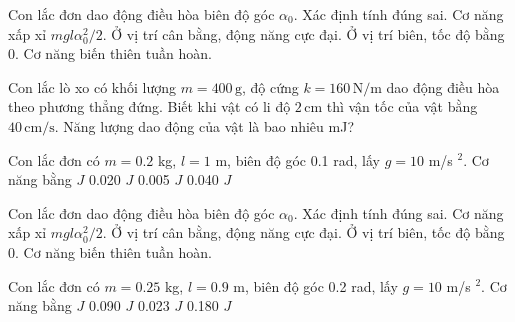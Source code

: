 \begin{ex}
Con lắc đơn dao động điều hòa biên độ góc $\alpha_0$. Xác định tính đúng sai.
\choiceTF
{\True Cơ năng xấp xỉ $mgl\alpha_0^2/2$.}
{\True Ở vị trí cân bằng, động năng cực đại.}
{\True Ở vị trí biên, tốc độ bằng 0.}
{Cơ năng biến thiên tuần hoàn.}
\end{ex}

\begin{ex}
Con lắc lò xo có khối lượng $m=400\,\text{g}$, độ cứng $k=160\,\text{N/m}$ dao động điều hòa theo phương thẳng đứng. Biết khi vật có li độ $2\,\text{cm}$ thì vận tốc của vật bằng $40\,\text{cm/s}$. Năng lượng dao động của vật là bao nhiêu mJ?
\end{ex}

\begin{ex}
Con lắc đơn có $m=0.2$ kg, $l=1$ m, biên độ góc 0.1 rad, lấy $g=10$ m/s $^2$. Cơ năng bằng
\choice
{ $J$}
{0.020 $J$}
{0.005 $J$}
{0.040 $J$}
\end{ex}

\begin{ex}
Con lắc đơn dao động điều hòa biên độ góc $\alpha_0$. Xác định tính đúng sai.
\choiceTF
{\True Cơ năng xấp xỉ $mgl\alpha_0^2/2$.}
{\True Ở vị trí cân bằng, động năng cực đại.}
{\True Ở vị trí biên, tốc độ bằng 0.}
{Cơ năng biến thiên tuần hoàn.}
\end{ex}


\begin{ex}
Con lắc đơn có $m=0.25$ kg, $l=0.9$ m, biên độ góc 0.2 rad, lấy $g=10$ m/s $^2$. Cơ năng bằng
\choice
{ $J$}
{0.090 $J$}
{0.023 $J$}
{0.180 $J$}
\end{ex}

